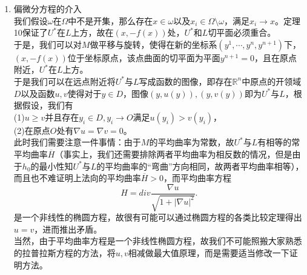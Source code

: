 \begin{enumerate}
\begin{theorem}
(1)$\omega\bigcap\Omega_{\lambda}\neq\emptyset$，\\
(2)$\omega\bigcap\Omega_{\lambda}$是平面$x^{n+1}=0$上的闭集。
\end{theorem}
\begin{proof}
(1)各连通分支的边界上的点$x\in\partial\Omega_{\lambda}$均满足$f(x)=0$，故$(x,-f(x))=(x,0)\in L$，即$x\in\omega$。\\
(2)只要分别证明$\omega$和$\Omega_{\lambda}$是闭集即可。对于前者，$\omega$的定义属于闭条件，故$\omega$为闭集。对于后者，$U$的定义为闭条件，故$U$是闭集，由于$U$是$\Omega$上定义的连续函数$f$的图像，故$\Omega$也是平面$x^{n+1}=0$上的闭集，于是它的连通分支也都是平面上闭集。
\end{proof}
现在，大家应该不难想到，只要能够证明$\omega$在$\Omega$中是开集，即可证明$\omega=\Omega$，此时我们有$U^{\ast}\subseteq L$。再根据$M$是正则连通闭曲面知$U^{\ast}=L$，所以在$x^{n+1}$轴方向，$M$关于平面$x^{n+1}=0$轴对称，这样的话就完成了证明。\\
所以最后我们将证明$\omega$在$\Omega$中是开集。



\item 偏微分方程的介入\\
我们假设$\omega$在$\Omega$中不是开集，那么存在$x\in\omega$以及$x_{i}\in\Omega\setminus\omega$，满足$x_{i}\rightarrow x$。定理10保证了$U^{\ast}$在$L$上方，故在$(x,-f(x))$处，$U^{\ast}$和$L$切平面必须重合。\\
于是，我们可以对$M$做平移与旋转，使得在新的坐标系$(y^{1},\cdots,y^{n},y^{n+1})$下，$(x,-f(x))$位于坐标原点，该点曲面的切平面为平面$y^{n+1}=0$，且在原点附近，$U^{\ast}$在$L$上方。\\
于是我们可以在远点附近将$U^{\ast}$与$L$写成函数的图像，即存在$\mathbb{R}^{n}$中原点的开领域$D$以及函数$u,v$使得对于$y\in D$，图像$(y,u(y)),(y,v(y))$即为$U^{\ast}$与$L$，根据假设，我们有\\
(1)$u\geq v$并且存在$y_{i}\in D, y_{i}\rightarrow O$满足$u(y_{i})>v(y_{i})$，\\
(2)在原点$O$处有$\nabla u=\nabla v=0$。\\
此时我们需要注意一件事情：由于$M$的平均曲率为常数，故$U^{\ast}$与$L$有相等的常平均曲率$\overline{H}$（事实上，我们还需要排除两者平均曲率为相反数的情况，但是由于$h_{0}$的最小性知$U^{\ast}$与$L$的平均曲率的“弯曲”方向相同，故两者平均曲率相等），而且也不难证明上法向的平均曲率$\overline{H}>0$，而平均曲率方程
\begin{displaymath}
H=div\frac{\nabla u}{\sqrt{1+|\nabla u|^{2}}}.
\end{displaymath}
是一个非线性的椭圆方程，故很有可能可以通过椭圆方程的各类比较定理得出$u=v$，进而推出矛盾。\\
当然，由于平均曲率方程是一个非线性椭圆方程，故我们不可能照搬大家熟悉的拉普拉斯方程的方法，将$u,v$相减做最大值原理，而是需要适当修改一下证明方法。





\end{enumerate}
